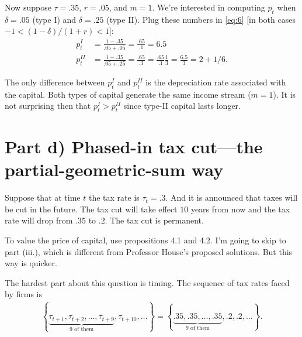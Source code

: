 \documentclass[12pt]{pracjourn_rwr}
\theoremstyle{definition}
\theoremstyle{remark}
\begin{document}
Now suppose $\tau = .35$, $r = .05$, and $m = 1$.
We're interested in computing $p_{t}$ when $\delta = .05$ (type I) and $\delta = .25$ (type II).
Plug these numbers in \eqref{eq:6} [in both cases $-1 < (1-\delta) / (1+r) < 1$]:
\begin{align*}
p^{I}_{t} &= \frac{1-.35}{.05 + .05} = \frac{.65}{.1} = 6.5 \\
p^{II}_{t} &= \frac{1-.35}{.05 + .25} = \frac{.65}{.3} = \frac{.65}{.1} \frac{1}{3} = \frac{6.5}{3} = 2 + 1/6.
\end{align*}

The only difference between $p_{t}^{I}$ and $p_{t}^{II}$ is the depreciation rate associated with the capital.
Both types of capital generate the same income stream ($m = 1$).
It is not surprising then that $p_{t}^{I} > p_{t}^{II}$ since type-II capital lasts longer.

\section{Part d) Phased-in tax cut---the partial-geometric-sum way}
\label{sec:part-d-geometric-sum}

Suppose that at time $t$ the tax rate is $\tau_{t} = .3$.
And it is announced that taxes will be cut in the future.
The tax cut will take effect $10$ years from now and the tax rate will drop from $.35$ to $.2$.
The tax cut is permanent.

To value the price of capital, use propositions 4.1 and 4.2.
I'm going to skip to part (iii.), which is different from Professor House's proposed solutions.
But this way is quicker.

The hardest part about this question is timing.
The sequence of tax rates faced by firms is
\begin{align*}
\left\{ \underbrace{\tau_{t+1},\tau_{t+2},\dots,\tau_{t+9}}_{\text{9 of them}},\tau_{t+10},\dots \right\} =
\left\{ \underbrace{.35, .35, \dots, .35}_{\text{9 of them}},.2, .2,\dots \right\}.
\end{align*}
\end{document}
